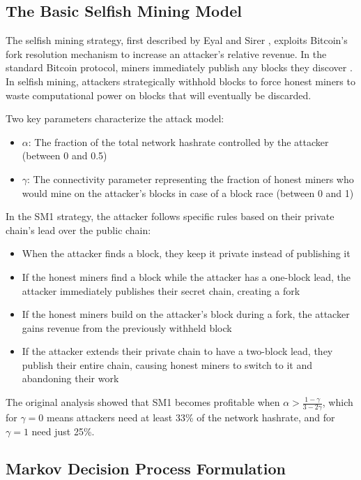 \documentclass[conference]{IEEEtran}
\begin{document}
\subsection{The Basic Selfish Mining Model}

The selfish mining strategy, first described by Eyal and Sirer \cite{eyal2018majority}, exploits Bitcoin's fork resolution mechanism to increase an attacker's relative revenue. In the standard Bitcoin protocol, miners immediately publish any blocks they discover \cite{nakamoto2008bitcoin}. In selfish mining, attackers strategically withhold blocks to force honest miners to waste computational power on blocks that will eventually be discarded.

Two key parameters characterize the attack model:
\begin{itemize}
    \item $\alpha$: The fraction of the total network hashrate controlled by the attacker (between 0 and 0.5)
    \item $\gamma$: The connectivity parameter representing the fraction of honest miners who would mine on the attacker's blocks in case of a block race (between 0 and 1)
\end{itemize}

In the SM1 strategy, the attacker follows specific rules based on their private chain's lead over the public chain:
\begin{itemize}
    \item When the attacker finds a block, they keep it private instead of publishing it
    \item If the honest miners find a block while the attacker has a one-block lead, the attacker immediately publishes their secret chain, creating a fork
    \item If the honest miners build on the attacker's block during a fork, the attacker gains revenue from the previously withheld block
    \item If the attacker extends their private chain to have a two-block lead, they publish their entire chain, causing honest miners to switch to it and abandoning their work
\end{itemize}

The original analysis showed that SM1 becomes profitable when $\alpha > \frac{1-\gamma}{3-2\gamma}$, which for $\gamma=0$ means attackers need at least 33\% of the network hashrate, and for $\gamma=1$ need just 25\%.

\subsection{Markov Decision Process Formulation}
\end{document}
